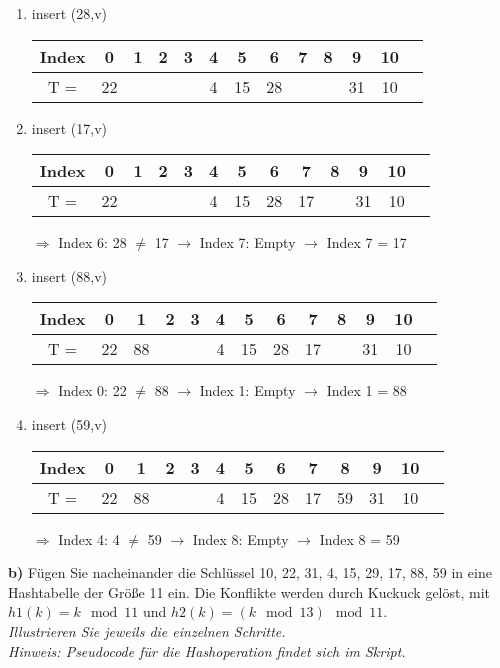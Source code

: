 \begin{enumerate}
\item insert (28,v)

\begin{center}
\begin{tabular}{|c|c|c|c|c|c|c|c|c|c|c|c|c|}
\hline
Index & 0 & 1 & 2 & 3 & 4 & 5 & 6 & 7 & 8 & 9 & 10\\
\hline
T = & 22 & & & & 4 & 15 & 28 & & & 31 & 10\\
\hline
\end{tabular}
\end{center}

\item insert (17,v)

\begin{center}
\begin{tabular}{|c|c|c|c|c|c|c|c|c|c|c|c|c|}
\hline
Index & 0 & 1 & 2 & 3 & 4 & 5 & 6 & 7 & 8 & 9 & 10\\
\hline
T = & 22 & & & & 4 & 15 & 28 & 17 & & 31 & 10\\
\hline
\end{tabular}
\end{center}
$\Rightarrow$ Index 6: 28 $\neq$ 17 $\rightarrow$ Index 7: Empty $\rightarrow$ Index 7 = 17

\item insert (88,v)

\begin{center}
\begin{tabular}{|c|c|c|c|c|c|c|c|c|c|c|c|c|}
\hline
Index & 0 & 1 & 2 & 3 & 4 & 5 & 6 & 7 & 8 & 9 & 10\\
\hline
T = & 22 & 88 & & & 4 & 15 & 28 & 17 & & 31 & 10\\
\hline
\end{tabular}
\end{center}
$\Rightarrow$ Index 0: 22 $\neq$ 88 $\rightarrow$ Index 1: Empty $\rightarrow$ Index 1 = 88

\item insert (59,v)

\begin{center}
\begin{tabular}{|c|c|c|c|c|c|c|c|c|c|c|c|c|}
\hline
Index & 0 & 1 & 2 & 3 & 4 & 5 & 6 & 7 & 8 & 9 & 10\\
\hline
T = & 22 & 88 & & & 4 & 15 & 28 & 17 & 59 & 31 & 10\\
\hline
\end{tabular}
\end{center}
$\Rightarrow$ Index 4: 4 $\neq$ 59 $\rightarrow$ Index 8: Empty $\rightarrow$ Index 8 = 59


\end{enumerate}

\noindent
\textbf{b)} Fügen Sie nacheinander die Schlüssel 10, 22, 31, 4, 15, 29, 17, 88, 59 in eine Hashtabelle der Größe 11 ein. Die Konflikte werden durch Kuckuck gelöst, mit $h1(k) = k \mod 11$ und $h2(k) = (k \mod 13) \mod 11$.\\

\noindent
\textit{Illustrieren Sie jeweils die einzelnen Schritte.\\
	Hinweis: Pseudocode für die Hashoperation findet sich im Skript.}